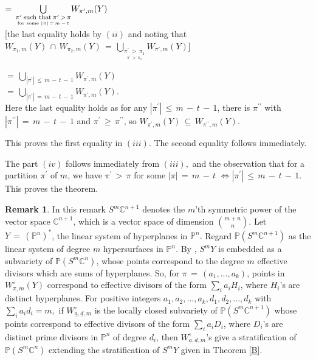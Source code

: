 \documentclass[12pt,reqno]{amsart}
\theoremstyle{definition}
\newtheorem{remark}[lemma]{Remark}
\numberwithin{equation}{section}
\begin{document}
\hspace{89pt}$=\,\underset{\underset{\textnormal{for some } |\pi|\, =\, m \,-\, t}{\pi^{\prime}\medspace \textnormal{such that}\medspace \pi'\, >\, \pi}}{\bigcup} W_{\pi', m}(Y)$ \\
 
     
[the last equality holds by  $(ii)$ and noting that 
 $W_{\pi_{1},m}(Y)\, \cap\, W_{\pi_{2},m}(Y)\, =\, \underset{\underset{\pi^{\prime}\, >\, \pi_{2}}{\pi^{\prime}\,>\,\pi_{1}}}\bigcup W_{\pi', m}(Y)$]

\hspace{87pt} $=\,\underset{|\pi^{\prime}|\,\leq\, m\,-\,t\,-\,1}{\bigcup}W_{\pi^{\prime},m}(Y)$\\


\hspace{87pt}$=\, \underset{|\pi^{\prime}|\,=\,m\,-\,t\,-\,1}{\bigcup}W_{\pi^{\prime},m}(Y).$\\

Here the last equality holds as for any $|\pi^{\prime}|\,\leq\, m\,-\,t\,-\,1$, there  is $\pi^{\prime\prime}$ with $|\pi^{\prime \prime}|\,=\,m\,-\,t\,-\,1$ and $ \pi^{\prime} \,\geq\, \pi^{\prime\prime}$, so  $W_{\pi^{\prime},m}(Y) \,\subseteq\, W_{\pi^{\prime\prime},m}(Y).$

This proves the first equality in $(iii).$ The second equality follows immediately.

The part $(iv)$ follows immediately from $(iii),$ and the observation that for a partition $ \pi^{\prime}$ of $m$, we have $\pi^{\prime}\,>\,\pi$ for some $|\pi|\,=\,m\,-\,t$ $\iff  |\pi^{\prime}|\, \leq\, m\,-\,t\,-\,1.$ This proves the theorem.

\begin{remark}
In this remark $S^m \mathbb{C}^{n+1}$  denotes the $m$'th symmetric power of the vector space $\mathbb{C}^{n+1}$, which is a vector space of dimension ${m+n}\choose{n}$. Let $Y\,=\,(\mathbb{P}^n)^*$, the linear system of hyperplanes in $\mathbb{P}^n.$ Regard $\mathbb{P}(S^m\mathbb{C}^{n+1})$ as the linear system of degree $m$ hypersurfaces in $\mathbb{P}^n$. By {\cite[corollary 3.3.11, theorem 3.1.12]{Ry}}, $S^mY$ is embedded as a subvariety of $\mathbb{P}(S^m\mathbb{C}^n)$, whose points correspond to the degree $m$ effective divisors which are sums of hyperplanes. So, for $\pi\,=\,(a_1,...,a_k)$, points in $W_{\pi,m}^{\circ}(Y)$ correspond to effective divisors of the form $\sum_i a_i H_i$, where $H_i$'s are distinct hyperplanes. For positive integers $a_1, a_2, ..., a_k, d_1, d_2,...,d_k$ with $\sum_i a_id_i=m,$ if $W_{\underline{a}, \underline{d},m}^{\circ}$ is the locally closed subvariety of  $\mathbb{P}(S^m\mathbb{C}^{n+1})$ whose points correspond to effective divisors of the form $\sum_i a_i D_i$, where $D_i$'s are distinct prime divisors in $\mathbb{P}^n$ of degree $d_i$, then $W_{\underline{a}, \underline{d},m}^{\circ}$'s give a stratification of $\mathbb{P}(S^m\mathbb{C}^n)$ extending the stratification of $S^mY$ given in Theorem \ref{B}.
\end{remark}
\end{document}
